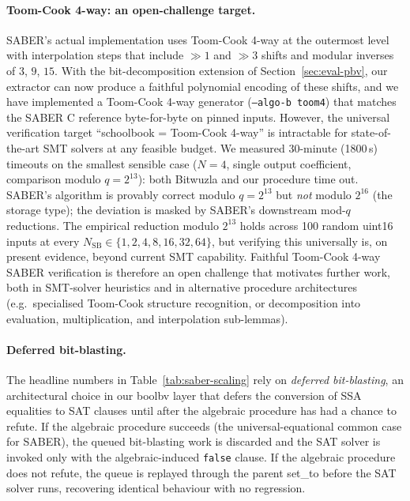 \documentclass[runningheads]{llncs}
\begin{document}
\paragraph{Toom-Cook 4-way: an open-challenge target.}
SABER's actual implementation uses Toom-Cook 4-way at the
outermost level with interpolation steps that include $\gg 1$
and $\gg 3$ shifts and modular inverses of $3$, $9$, $15$.
With the bit-decomposition extension of
Section~\ref{sec:eval-pbv}, our extractor can now produce a
faithful polynomial encoding of these shifts, and we have
implemented a Toom-Cook 4-way generator
(\texttt{--algo-b toom4}) that matches the SABER C reference
byte-for-byte on pinned inputs. However, the universal
verification target ``schoolbook = Toom-Cook 4-way'' is
intractable for state-of-the-art SMT solvers at any feasible
budget. We measured 30-minute (1800\,s) timeouts on the
smallest sensible case ($N = 4$, single output coefficient,
comparison modulo $q = 2^{13}$): both Bitwuzla and our
procedure time out. SABER's algorithm is provably correct
modulo $q = 2^{13}$ but \emph{not} modulo $2^{16}$ (the
storage type); the deviation is masked by SABER's downstream
mod-$q$ reductions. The empirical reduction modulo $2^{13}$
holds across 100 random uint16 inputs at every
$N_{\mathrm{SB}} \in \{1, 2, 4, 8, 16, 32, 64\}$, but verifying
this universally is, on present evidence, beyond current
SMT capability. Faithful Toom-Cook 4-way SABER verification is
therefore an open challenge that motivates further work, both
in SMT-solver heuristics and in alternative procedure
architectures (e.g.\ specialised Toom-Cook structure
recognition, or decomposition into evaluation, multiplication,
and interpolation sub-lemmas).

\paragraph{Deferred bit-blasting.}
\label{sec:eval-saber-defer}
The headline numbers in Table~\ref{tab:saber-scaling} rely on
\emph{deferred bit-blasting}, an architectural choice in our
boolbv layer that defers the conversion of SSA equalities to
SAT clauses until after the algebraic procedure has had a
chance to refute. If the algebraic procedure succeeds (the
universal-equational common case for SABER), the queued
bit-blasting work is discarded and the SAT solver is invoked
only with the algebraic-induced \texttt{false} clause. If the
algebraic procedure does not refute, the queue is replayed
through the parent set\_to before the SAT solver runs,
recovering identical behaviour with no regression.
\end{document}

